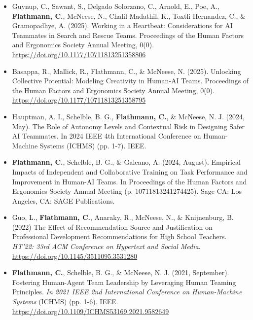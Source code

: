 \begin{itemize}[align=left, labelwidth=3em,]
\item[C.14] Guynup, C., Sawant, S., Delgado Solorzano, C., Arnold, E., Poe, A., \textbf{Flathmann, C.}, McNeese, N., Chalil Madathil, K., Toxtli Hernandez, C., \& Gramopadhye, A. (2025). Working in a Heartbeat: Considerations for AI Teammates in Search and Rescue Teams. Proceedings of the Human Factors and Ergonomics Society Annual Meeting, 0(0). \url{https://doi.org/10.1177/10711813251358806} \\


\item[C.13] Basappa, R., Mallick, R., Flathmann, C., \& McNeese, N. (2025). Unlocking Collective Potential: Modeling Creativity in Human-AI Teams. Proceedings of the Human Factors and Ergonomics Society Annual Meeting, 0(0). \url{https://doi.org/10.1177/10711813251358795} \\


\item[C.12] Hauptman, A. I., Schelble, B. G., \textbf{Flathmann, C.}, \& McNeese, N. J. (2024, May). The Role of Autonomy Levels and Contextual Risk in Designing Safer AI Teammates. In 2024 IEEE 4th International Conference on Human-Machine Systems (ICHMS) (pp. 1-7). IEEE. \\

\item[C.11] \textbf{Flathmann, C.}, Schelble, B. G., \& Galeano, A. (2024, August). Empirical Impacts of Independent and Collaborative Training on Task Performance and Improvement in Human-AI Teams. In Proceedings of the Human Factors and Ergonomics Society Annual Meeting (p. 10711813241274425). Sage CA: Los Angeles, CA: SAGE Publications.\\

\item[C.10] Guo, L., \textbf{Flathmann, C.}, Anaraky, R., McNeese, N., \& Knijnenburg, B. (2022) The Effect of Recommendation Source and Justification on Professional Development Recommendations for High School Teachers. \textit{HT’22: 33rd ACM Conference on Hypertext and Social Media}. \url{https://doi.org/10.1145/3511095.3531280}\\

\item[C.9] \textbf{Flathmann, C.}, Schelble, B. G., \& McNeese, N. J. (2021, September). Fostering Human-Agent Team Leadership by Leveraging Human Teaming Principles. \textit{In 2021 IEEE 2nd International Conference on Human-Machine Systems} (ICHMS) (pp. 1-6). IEEE. \url{https://doi.org/10.1109/ICHMS53169.2021.9582649}\\


\end{itemize}
